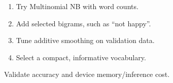 
\begin{enumerate}[start=1]

\item Try Multinomial NB with word counts.

\item Add selected bigrams, such as “not happy”.

\item Tune additive smoothing on validation data.

\item Select a compact, informative vocabulary.

\end{enumerate}


Validate accuracy and device memory/inference cost.
